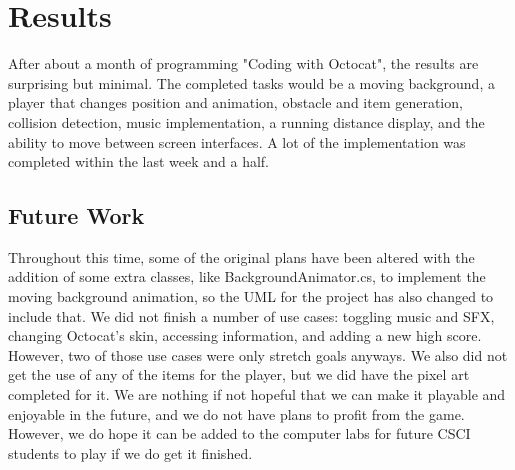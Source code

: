 \documentclass[10pt,conference,onecolumn,compsoc]{IEEEtran}
\begin{document}
\section{Results}
After about a month of programming "Coding with Octocat", the results are surprising but minimal. The completed tasks would be a moving background, a player that changes position and animation, obstacle and item generation, collision detection, music implementation, a running distance display, and the ability to move between screen interfaces. A lot of the implementation was completed within the last week and a half.

\subsection{Future Work}
Throughout this time, some of the original plans have been altered with the addition of some extra classes, like BackgroundAnimator.cs, to implement the moving background animation, so the UML for the project has also changed to include that. We did not finish a number of use cases: toggling music and SFX, changing Octocat's skin, accessing information, and adding a new high score. However, two of those use cases were only stretch goals anyways. We also did not get the use of any of the items for the player, but we did have the pixel art completed for it. We are nothing if not hopeful that we can make it playable and enjoyable in the future, and we do not have plans to profit from the game. However, we do hope it can be added to the computer labs for future CSCI students to play if we do get it finished. 

\end{document}
